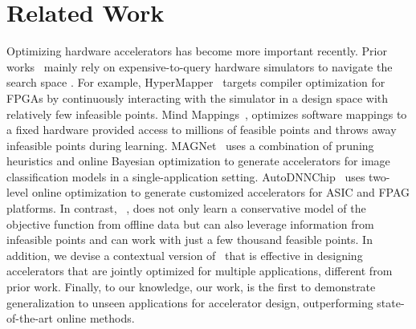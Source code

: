 \section{Related Work}
\label{sec:related}
%
Optimizing hardware accelerators has become more important recently. Prior works~\citep{bo:frontiers:2020,flexibo:arxiv:2020,cnn_gen:cyber:2020,prac_dse:mascots:2019,accel_gen:dac:2018,spatial:pldi:2018,automomml:hpc:2016,opentuner:pact:2014,hegdemind,magnet,autodnnchip} mainly rely on expensive-to-query hardware simulators to navigate the search space . For example, HyperMapper~\citep{prac_dse:mascots:2019} targets compiler optimization for FPGAs by continuously interacting with the simulator in a design space with relatively few infeasible points. Mind Mappings~\citep{hegdemind}, optimizes software mappings to a fixed hardware provided access to millions of feasible points and throws away infeasible points during learning. {MAGNet~\citep{magnet} uses a combination of pruning heuristics and online Bayesian optimization to generate accelerators for image classification models in a single-application setting.} {AutoDNNChip~\citep{autodnnchip} uses two-level online optimization to generate customized  accelerators for ASIC and FPAG platforms.} In contrast, \primemethodname~, does not only learn a conservative model of the objective function from offline data but can also leverage information from infeasible points and can work with just a few thousand feasible points. {In addition, we devise a contextual version of \primemethodname\ that is effective in designing accelerators that are jointly optimized for multiple applications, different from prior work.} Finally, to our knowledge, our work, is the first to demonstrate generalization to unseen applications for accelerator design, outperforming state-of-the-art online methods.

